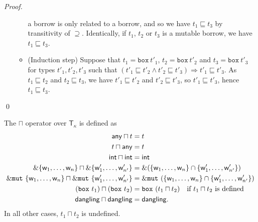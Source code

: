 \begin{proof}
\begin{itemize}
\begin{itemize}
      a borrow is only related to a borrow, and so we have
      $t_1\sqsubseteq t_3$ by transitivity of $\supseteq$.
      Identically, if $t_1$, $t_2$ or $t_3$ is a mutable borrow, we have
      $t_1\sqsubseteq t_3$.
      \item (Induction step) Suppose that $t_1=\mathtt{box}\ t'_1$,
      $t_2=\mathtt{box}\ t'_2$ and $t_3=\mathtt{box}\ t'_3$ for types
      $t'_1,t'_2,t'_3$ such that
      $(t'_1 \sqsubseteq t'_2 \land t'_2 \sqsubseteq t'_3) \Rightarrow
      t'_1 \sqsubseteq t'_3$.
      As $t_1 \sqsubseteq t_2$ and $t_2 \sqsubseteq t_3$, we have
      $t'_1 \sqsubseteq t'_2$ and $t'_2 \sqsubseteq t'_3$, so
      $t'_1 \sqsubseteq t'_3$, hence $t_1 \sqsubseteq t_3$.
    \end{itemize}
  \end{itemize}
  \qed
\end{proof}

\begin{definition}
  The $\sqcap$ operator over $\mathsf{T}_\kappa$ is defined as
  \begin{align*}
    \mathsf{any}\sqcap t &= t\\
    t\sqcap\mathsf{any}&=t\\
    \mathsf{int}\sqcap\mathsf{int} &= \mathsf{int}\\
    \borrow\{\mathsf{w}_1,\ldots,\mathsf{w}_n\} \sqcap \borrow\{\mathsf{w}'_1,\ldots,\mathsf{w}'_{n'}\} &= \borrow(\{\mathsf{w}_1,\ldots,\mathsf{w}_n\}\cap\{\mathsf{w}'_1,\ldots,\mathsf{w}'_{n'}\})\\
    \mutborrow\{\mathsf{w}_1,\ldots,\mathsf{w}_n\} \sqcap \mutborrow\{\mathsf{w}'_1,\ldots,\mathsf{w}'_{n'}\} &= \mutborrow(\{\mathsf{w}_1,\ldots,\mathsf{w}_n\}\cap\{\mathsf{w}'_1,\ldots,\mathsf{w}'_{n'}\})\\
    (\mathtt{box}\ t_1) \sqcap (\mathtt{box}\ t_2) &=\mathtt{box}\ (t_1\sqcap t_2)\quad\text{if $t_1\sqcap t_2$ is defined}\\
    \mathsf{dangling}\sqcap\mathsf{dangling} &= \mathsf{dangling}.
  \end{align*}
  In all other cases, $t_1\sqcap t_2$ is undefined.
\end{definition}

